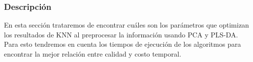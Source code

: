 \subsubsection{Descripción}

En esta sección trataremos de encontrar cuáles son los parámetros que optimizan los resultados de KNN al preprocesar la información usando PCA y PLS-DA. Para esto tendremos en cuenta los tiempos de ejecución de los algoritmos para encontrar la mejor relación entre calidad y costo temporal.
